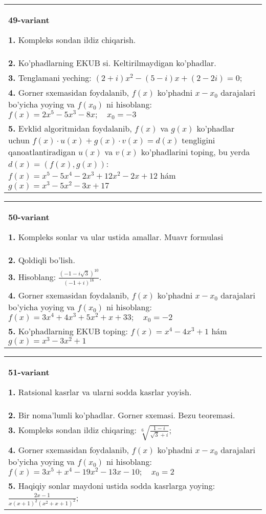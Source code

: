 \documentclass{article}
\begin{document}
\begin{tabular}{m{17cm}}
\textbf{49-variant}
\newline

\textbf{1.} Kompleks sondan ildiz chiqarish. \\
\textbf{2.} Ko’phadlarning EKUB si. Keltirilmaydigan ko’phadlar. \\
\textbf{3.} Tenglamani yeching:  $(2+i) x^2-(5-i) x+(2-2 i)=0$; \\
\textbf{4.} Gorner sxemasidan foydalanib, $f(x)$ ko’phadni $x-x_0$ darajalari bo’yicha yoying va $f\left(x_0\right)$ ni hisoblang: $f(x)=2 x^5-5 x^3-8 x ; \quad x_0=-3$ \\
\textbf{5.} Evklid algoritmidan foydalanib, $f(x)$ va $g(x)$ ko’phadlar uchun $f(x) \cdot u(x)+g(x) \cdot v(x)=d(x)$ tengligini qanoatlantiradigan $u(x)$ va $v(x)$ ko’phadlarini toping, bu yerda $d(x)=(f(x), g(x))$:  $f(x)=x^5-5 x^4-2 x^3+12 x^2-2 x+12$ hám $g(x)=x^3-5 x^2-3 x+17$ \\

\end{tabular}
\vspace{1cm}


\begin{tabular}{m{17cm}}
\textbf{50-variant}
\newline

\textbf{1.} Kompleks sonlar va ular ustida amallar. Muavr formulasi  \\
\textbf{2.} Qoldiqli bo’lish.  \\
\textbf{3.} Hisoblang:  $\frac{(-1-i \sqrt{3})^{10}}{(-1+i)^{16}}$. \\
\textbf{4.} Gorner sxemasidan foydalanib, $f(x)$ ko’phadni $x-x_0$ darajalari bo’yicha yoying va $f\left(x_0\right)$ ni hisoblang: $f(x)=3 x^4+4 x^3+5 x^2+x+33 ; \quad x_0=-2$ \\
\textbf{5.} Ko’phadlarning EKUB toping:  $f(x)=x^4-4 x^3+1$ hám $g(x)=x^3-3 x^2+1$ \\

\end{tabular}
\vspace{1cm}


\begin{tabular}{m{17cm}}
\textbf{51-variant}
\newline

\textbf{1.} Ratsional kasrlar va ularni sodda kasrlar yoyish. \\
\textbf{2.} Bir noma’lumli ko’phadlar. Gorner sxemasi. Bezu teoremasi.  \\
\textbf{3.} Kompleks sondan ildiz chiqaring: $\sqrt[6]{\frac{1-i}{\sqrt{3}+i}}$; \\
\textbf{4.} Gorner sxemasidan foydalanib, $f(x)$ ko’phadni $x-x_0$ darajalari bo’yicha yoying va $f\left(x_0\right)$ ni hisoblang: $f(x)=3 x^5+x^4-19 x^2-13 x-10 ; \quad x_0=2$ \\
\textbf{5.} Haqiqiy sonlar maydoni ustida sodda kasrlarga yoying:  $\frac{2 x-1}{x(x+1)^2\left(x^2+x+1\right)^2}$; \\

\end{tabular}
\vspace{1cm}
\end{document}
